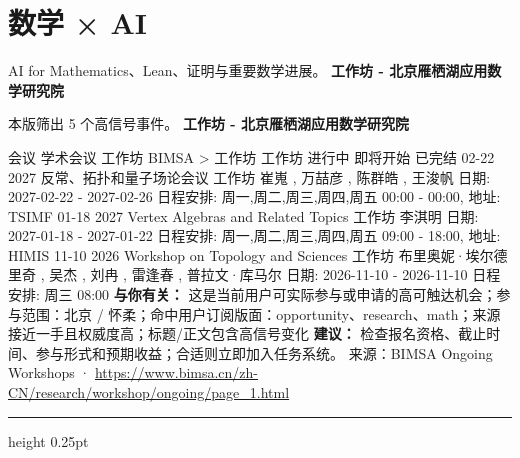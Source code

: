 \documentclass[10.5pt]{ctexart}
\begin{document}
\section*{数学 × AI}
{\color{ormuted} AI for Mathematics、Lean、证明与重要数学进展。}
\vspace{2mm}
{\LARGE\bfseries 工作坊 - 北京雁栖湖应用数学研究院}\par
\vspace{1mm}
{\color{ormuted} 本版筛出 5 个高信号事件。}
\vspace{3mm}
{\Large\bfseries 工作坊 - 北京雁栖湖应用数学研究院}\par
会议 学术会议 工作坊 BIMSA > 工作坊 工作坊 进行中 即将开始 已完结 02-22 2027 反常、拓扑和量子场论会议 工作坊 崔嵬 , 万喆彦 , 陈群皓 , 王浚帆 日期: 2027-02-22 - 2027-02-26 日程安排: 周一,周二,周三,周四,周五 00:00 - 00:00, 地址: TSIMF 01-18 2027 Vertex Algebras and Related Topics 工作坊 李淇明 日期: 2027-01-18 - 2027-01-22 日程安排: 周一,周二,周三,周四,周五 09:00 - 18:00, 地址: HIMIS 11-10 2026 Workshop on Topology and Sciences 工作坊 布里奥妮·埃尔德里奇 , 吴杰 , 刘冉 , 雷逢春 , 普拉文·库马尔 日期: 2026-11-10 - 2026-11-10 日程安排: 周三 08:00
\textbf{与你有关：} 这是当前用户可实际参与或申请的高可触达机会；参与范围：北京 / 怀柔；命中用户订阅版面：opportunity、research、math；来源接近一手且权威度高；标题/正文包含高信号变化
\textbf{建议：} 检查报名资格、截止时间、参与形式和预期收益；合适则立即加入任务系统。
{\footnotesize\color{ormuted} 来源：BIMSA Ongoing Workshops · \url{https://www.bimsa.cn/zh-CN/research/workshop/ongoing/page_1.html}}
\vspace{4mm}
\hrule height 0.25pt
\vspace{3mm}
\end{document}
